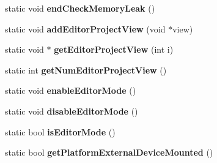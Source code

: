 \begin{DoxyCompactItemize}
\item 
static void {\bfseries end\+Check\+Memory\+Leak} ()\hypertarget{class_magnum_1_1_stage_a8cd0e8d82d261e37df55da8f09998d6a}{}\label{class_magnum_1_1_stage_a8cd0e8d82d261e37df55da8f09998d6a}

\item 
static void {\bfseries add\+Editor\+Project\+View} (void $\ast$view)\hypertarget{class_magnum_1_1_stage_a2b89da067962776e93c591e5d1b7c68c}{}\label{class_magnum_1_1_stage_a2b89da067962776e93c591e5d1b7c68c}

\item 
static void $\ast$ {\bfseries get\+Editor\+Project\+View} (int i)\hypertarget{class_magnum_1_1_stage_ae3a0187f169d457002c048fea3cd1d87}{}\label{class_magnum_1_1_stage_ae3a0187f169d457002c048fea3cd1d87}

\item 
static int {\bfseries get\+Num\+Editor\+Project\+View} ()\hypertarget{class_magnum_1_1_stage_a7a0bf37106ff7007597387a70f07117d}{}\label{class_magnum_1_1_stage_a7a0bf37106ff7007597387a70f07117d}

\item 
static void {\bfseries enable\+Editor\+Mode} ()\hypertarget{class_magnum_1_1_stage_a59721652ec6548f91688f332c08ba46b}{}\label{class_magnum_1_1_stage_a59721652ec6548f91688f332c08ba46b}

\item 
static void {\bfseries disable\+Editor\+Mode} ()\hypertarget{class_magnum_1_1_stage_ae6232ce8132296711ef288ebcf173c37}{}\label{class_magnum_1_1_stage_ae6232ce8132296711ef288ebcf173c37}

\item 
static bool {\bfseries is\+Editor\+Mode} ()\hypertarget{class_magnum_1_1_stage_ac4671703fa8ef19f2ca2a8941eefccc5}{}\label{class_magnum_1_1_stage_ac4671703fa8ef19f2ca2a8941eefccc5}

\item 
static bool {\bfseries get\+Platform\+External\+Device\+Mounted} ()\hypertarget{class_magnum_1_1_stage_aca0fc5faa9772b77964d1569dc4ba031}{}\label{class_magnum_1_1_stage_aca0fc5faa9772b77964d1569dc4ba031}

\end{DoxyCompactItemize}
